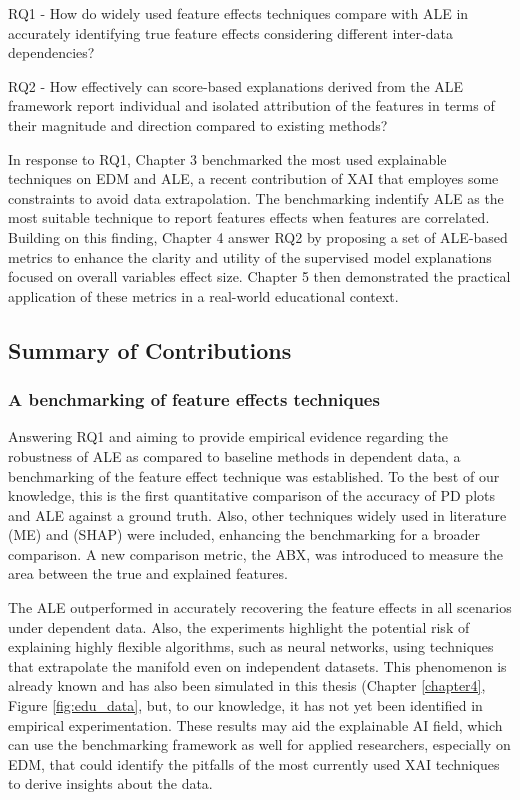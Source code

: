 RQ1 - How do widely used feature effects techniques compare with ALE in accurately identifying true feature effects considering different inter-data dependencies?

RQ2 - How effectively can score-based explanations derived from the ALE framework report individual and isolated attribution of the features in terms of their magnitude and direction compared to existing methods?

In response to RQ1, Chapter 3 benchmarked the most used explainable techniques on EDM and ALE, a recent contribution of XAI that employes some constraints to avoid data extrapolation. The benchmarking indentify ALE as the most suitable technique to report features effects when features are correlated. Building on this finding, Chapter 4 answer RQ2 by proposing a set of ALE-based metrics to enhance the clarity and utility of the supervised model explanations focused on overall variables effect size. Chapter 5 then demonstrated the practical application of these metrics in a real-world educational context.

\subsection{Summary of Contributions}

\subsubsection{A benchmarking of feature effects techniques}

Answering RQ1 and aiming to provide empirical evidence regarding the robustness of ALE as compared to baseline methods in dependent data, a benchmarking of the feature effect technique was established. To the best of our knowledge, this is the first quantitative comparison of the accuracy of PD plots and ALE against a ground truth. Also, other techniques widely used in literature (ME) and (SHAP) were included, enhancing the benchmarking for a broader comparison. A new comparison metric, the ABX, was introduced to measure the area between the true and explained features.

The ALE outperformed in accurately recovering the feature effects in all scenarios under dependent data. Also, the experiments highlight the potential risk of explaining highly flexible algorithms, such as neural networks, using techniques that extrapolate the manifold even on independent datasets. This phenomenon is already known and has also been simulated in this thesis (Chapter \ref{chapter4}, Figure \ref{fig:edu_data}, but, to our knowledge, it has not yet been identified in empirical experimentation. These results may aid the explainable AI field, which can use the benchmarking framework as well for applied researchers, especially on EDM, that could identify the pitfalls of the most currently used XAI techniques to derive insights about the data.

